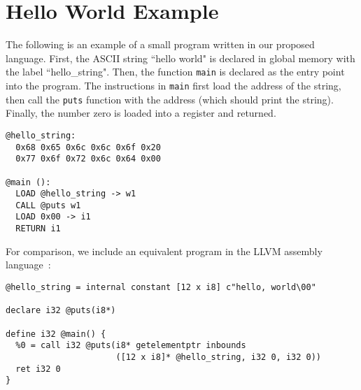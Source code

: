\section{Hello World Example}

The following is an example of a small program written in our proposed language.
First, the ASCII string ``hello world" is declared in global memory
with the label ``hello\_string".
Then, the function \texttt{main} is declared as the entry point
into the program. The instructions in \texttt{main} first load the address
of the string, then call the \texttt{puts} function with the address
(which should print the string). Finally, the number zero is loaded
into a register and returned.
\begin{verbatim}
@hello_string:
  0x68 0x65 0x6c 0x6c 0x6f 0x20
  0x77 0x6f 0x72 0x6c 0x64 0x00

@main ():
  LOAD @hello_string -> w1
  CALL @puts w1
  LOAD 0x00 -> i1
  RETURN i1
\end{verbatim}
For comparison, we include an equivalent program in the LLVM assembly language~\cite{lattner2008llvm}:
{\small
\begin{verbatim}
@hello_string = internal constant [12 x i8] c"hello, world\00"

declare i32 @puts(i8*)

define i32 @main() {
  %0 = call i32 @puts(i8* getelementptr inbounds
                      ([12 x i8]* @hello_string, i32 0, i32 0))
  ret i32 0
}
\end{verbatim}
}

